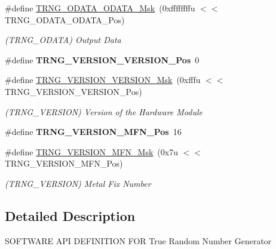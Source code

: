 \begin{DoxyCompactItemize}
\#define \mbox{\hyperlink{group__SAMV71__TRNG_ga29f339c544af097a0d2552bda327d4a5}{T\+R\+N\+G\+\_\+\+O\+D\+A\+T\+A\+\_\+\+O\+D\+A\+T\+A\+\_\+\+Msk}}~(0xffffffffu $<$$<$ T\+R\+N\+G\+\_\+\+O\+D\+A\+T\+A\+\_\+\+O\+D\+A\+T\+A\+\_\+\+Pos)
\begin{DoxyCompactList}\small\item\em (T\+R\+N\+G\+\_\+\+O\+D\+A\+TA) Output Data \end{DoxyCompactList}\item 
\mbox{\label{group__SAMV71__TRNG_ga44bd64ee07a5287958d01b5af467c32b}} 
\#define {\bfseries T\+R\+N\+G\+\_\+\+V\+E\+R\+S\+I\+O\+N\+\_\+\+V\+E\+R\+S\+I\+O\+N\+\_\+\+Pos}~0
\item 
\mbox{\label{group__SAMV71__TRNG_gad6dba2cbc1fdf54492042259ab77bc0e}} 
\#define \mbox{\hyperlink{group__SAMV71__TRNG_gad6dba2cbc1fdf54492042259ab77bc0e}{T\+R\+N\+G\+\_\+\+V\+E\+R\+S\+I\+O\+N\+\_\+\+V\+E\+R\+S\+I\+O\+N\+\_\+\+Msk}}~(0xfffu $<$$<$ T\+R\+N\+G\+\_\+\+V\+E\+R\+S\+I\+O\+N\+\_\+\+V\+E\+R\+S\+I\+O\+N\+\_\+\+Pos)
\begin{DoxyCompactList}\small\item\em (T\+R\+N\+G\+\_\+\+V\+E\+R\+S\+I\+ON) Version of the Hardware Module \end{DoxyCompactList}\item 
\mbox{\label{group__SAMV71__TRNG_ga839ab79fc0a33d55277a7643d99edb52}} 
\#define {\bfseries T\+R\+N\+G\+\_\+\+V\+E\+R\+S\+I\+O\+N\+\_\+\+M\+F\+N\+\_\+\+Pos}~16
\item 
\mbox{\label{group__SAMV71__TRNG_gadd753e4bba9e750c787a9804ce7c57f2}} 
\#define \mbox{\hyperlink{group__SAMV71__TRNG_gadd753e4bba9e750c787a9804ce7c57f2}{T\+R\+N\+G\+\_\+\+V\+E\+R\+S\+I\+O\+N\+\_\+\+M\+F\+N\+\_\+\+Msk}}~(0x7u $<$$<$ T\+R\+N\+G\+\_\+\+V\+E\+R\+S\+I\+O\+N\+\_\+\+M\+F\+N\+\_\+\+Pos)
\begin{DoxyCompactList}\small\item\em (T\+R\+N\+G\+\_\+\+V\+E\+R\+S\+I\+ON) Metal Fix Number \end{DoxyCompactList}\end{DoxyCompactItemize}


\subsection{Detailed Description}
S\+O\+F\+T\+W\+A\+RE A\+PI D\+E\+F\+I\+N\+I\+T\+I\+ON F\+OR True Random Number Generator 